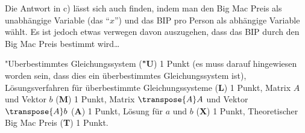 \begin{diskussion}
Die Antwort in c) lässt sich auch finden, indem man den Big Mac Preis
als unabhängige Variable (das ``$x$'') und das BIP pro Person als
abhängige Variable wählt. 
Es ist jedoch etwas verwegen davon auszugehen, dass das BIP durch den
Big Mac Preis bestimmt wird\dots
\end{diskussion}

\begin{bewertung}
"Uberbestimmtes Gleichungssystem ({\bf "U}) 1 Punkt (es muss darauf hingewiesen
worden sein, dass dies ein überbestimmtes Gleichungssystem ist),
Lösungsverfahren für überbestimmte Gleichungssysteme ({\bf L}) 1 Punkt,
Matrix $A$ und Vektor $b$ ({\bf M}) 1 Punkt,
Matrix $\transpose{A}A$ und Vektor $\transpose{A}b$ ({\bf A}) 1 Punkt,
Lösung für $a$ und $b$ ({\bf X}) 1 Punkt,
Theoretischer Big Mac Preis ({\bf T}) 1 Punkt.
\end{bewertung}

